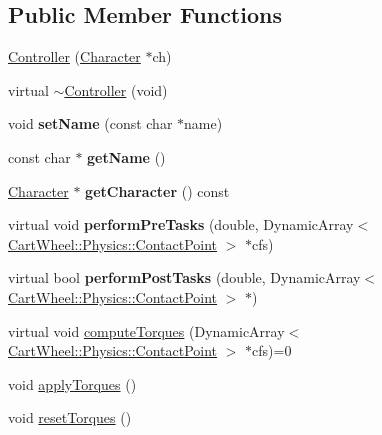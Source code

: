 \subsection*{Public Member Functions}
\begin{DoxyCompactItemize}
\item 
\hyperlink{classCartWheel_1_1Core_1_1Controller_a30666051b1d61857eb778c906e3936a6}{Controller} (\hyperlink{classCartWheel_1_1Core_1_1Character}{Character} $\ast$ch)
\item 
virtual \hyperlink{classCartWheel_1_1Core_1_1Controller_a3d53864db248f17f2443df8388053f9d}{$\sim$Controller} (void)
\item 
\hypertarget{classCartWheel_1_1Core_1_1Controller_af6fbaa1aa5f333564d15ba3ace42d465}{
void {\bfseries setName} (const char $\ast$name)}
\label{classCartWheel_1_1Core_1_1Controller_af6fbaa1aa5f333564d15ba3ace42d465}

\item 
\hypertarget{classCartWheel_1_1Core_1_1Controller_abf69d675073a931c98ccd4c99a1bee3a}{
const char $\ast$ {\bfseries getName} ()}
\label{classCartWheel_1_1Core_1_1Controller_abf69d675073a931c98ccd4c99a1bee3a}

\item 
\hypertarget{classCartWheel_1_1Core_1_1Controller_a17fbdd243942fe4ad17a503fa7582151}{
\hyperlink{classCartWheel_1_1Core_1_1Character}{Character} $\ast$ {\bfseries getCharacter} () const }
\label{classCartWheel_1_1Core_1_1Controller_a17fbdd243942fe4ad17a503fa7582151}

\item 
\hypertarget{classCartWheel_1_1Core_1_1Controller_a42c3669ce91840357f5f908140aa3547}{
virtual void {\bfseries performPreTasks} (double, DynamicArray$<$ \hyperlink{classCartWheel_1_1Physics_1_1ContactPoint}{CartWheel::Physics::ContactPoint} $>$ $\ast$cfs)}
\label{classCartWheel_1_1Core_1_1Controller_a42c3669ce91840357f5f908140aa3547}

\item 
\hypertarget{classCartWheel_1_1Core_1_1Controller_a21e80043aac65cc482aaff728e955c18}{
virtual bool {\bfseries performPostTasks} (double, DynamicArray$<$ \hyperlink{classCartWheel_1_1Physics_1_1ContactPoint}{CartWheel::Physics::ContactPoint} $>$ $\ast$)}
\label{classCartWheel_1_1Core_1_1Controller_a21e80043aac65cc482aaff728e955c18}

\item 
virtual void \hyperlink{classCartWheel_1_1Core_1_1Controller_a4355027883ca8a1be4048d95577b8e74}{computeTorques} (DynamicArray$<$ \hyperlink{classCartWheel_1_1Physics_1_1ContactPoint}{CartWheel::Physics::ContactPoint} $>$ $\ast$cfs)=0
\item 
void \hyperlink{classCartWheel_1_1Core_1_1Controller_a6502c5453efc4025d553365fe09b404b}{applyTorques} ()
\item 
void \hyperlink{classCartWheel_1_1Core_1_1Controller_a0847b1ef66cec7b82983b6990bb8265f}{resetTorques} ()
\end{DoxyCompactItemize}
